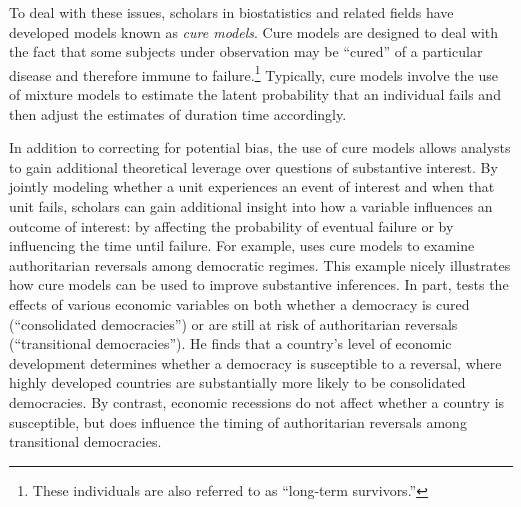 \documentclass{article}
\begin{document}
	To deal with these issues, scholars in biostatistics and related fields have developed models known as \textit{cure models}. Cure models are designed to deal with the fact that some subjects under observation may be ``cured'' of a particular disease and therefore immune to failure.\footnote{These individuals are also referred to as ``long-term survivors.''} Typically, cure models involve the use of mixture models to estimate the latent probability that an individual fails and then adjust the estimates of duration time accordingly. 
	
	In addition to correcting for potential bias, the use of cure models allows analysts to gain additional theoretical leverage over questions of substantive interest. By jointly modeling whether a unit experiences an event of interest and when that unit fails, scholars can gain additional insight into how a variable influences an outcome of interest: by affecting the probability of eventual failure or by influencing the time until failure.
	For example, \citep{svolik2008} uses cure models to examine authoritarian reversals among democratic regimes. This example nicely illustrates how cure models can be used to improve substantive inferences. In part, \citep{svolik2008} tests the effects of various economic variables on both whether a democracy is cured (``consolidated democracies'') or are still at risk of authoritarian reversals (``transitional democracies''). He finds that a country's level of economic development determines whether a democracy is susceptible to a reversal, where highly developed countries are substantially more likely to be consolidated democracies. By contrast, economic recessions do not affect whether a country is susceptible, but does influence the timing of authoritarian reversals among transitional democracies. 
	
\end{document}
